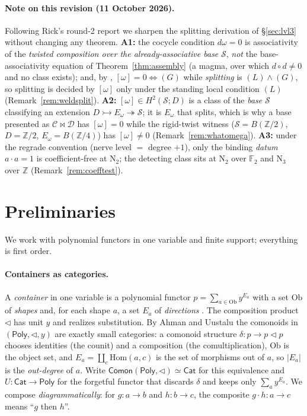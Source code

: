 \documentclass[11pt]{article}
\theoremstyle{definition}
\newcommand{\Poly}{\mathsf{Poly}}
\newcommand{\Cat}{\mathsf{Cat}}
\newcommand{\Comon}{\mathsf{Comon}}
\newcommand{\Ob}{\mathrm{Ob}}
\newcommand{\Hom}{\mathrm{Hom}}
\newcommand{\Z}{\mathbb{Z}}
\newcommand{\F}{\mathbb{F}}
\newcommand{\sS}{\mathcal{S}}
\newcommand{\cC}{\mathcal{C}}
\newcommand{\cD}{\mathcal{D}}
\newcommand{\lto}{\!\lhd\!}
\newcommand{\Nerve}{\mathrm{N}}
\begin{document}
\paragraph{Note on this revision (11 October 2026).} Following Rick's round-2 report we sharpen the
splitting derivation of \S\ref{sec:lvl3} without changing any theorem. \textbf{A1:} the cocycle
condition $d\omega=0$ is associativity of the \emph{twisted composition over the already-associative
base} $\sS$, \emph{not} the base-associativity equation of Theorem~\ref{thm:assembly} (a magma, over
which $d\circ d\neq0$ and no class exists); and, by \cite{MacBethZS}, $[\omega]=0\Leftrightarrow(G)$
while \emph{splitting} is $(L)\wedge(G)$, so splitting is decided by $[\omega]$ only under the
standing local condition $(L)$ (Remark~\ref{rem:weldsplit}). \textbf{A2:} $[\omega]\in H^2(\sS;D)$ is
a class of the \emph{base} $\sS$ classifying an extension $D\rightarrowtail E_\omega\twoheadrightarrow
\sS$; it is $E_\omega$ that splits, which is why a base presented as $\cC\bowtie\cD$ has $[\omega]=0$
while the rigid-twist witness ($\sS=B(\Z/2)$, $D=\Z/2$, $E_\omega=B(\Z/4)$) has $[\omega]\neq0$
(Remark~\ref{rem:whatomega}). \textbf{A3:} under the regrade convention (nerve level $=$ degree
$+1$), only the binding \emph{datum} $a\cdot a=1$ is coefficient-free at $\Nerve_2$; the detecting
class sits at $\Nerve_2$ over $\F_2$ and $\Nerve_3$ over $\Z$ (Remark~\ref{rem:coefftest}).

\section{Preliminaries}\label{sec:prelim}

We work with polynomial functors in one variable and finite support; everything is first order.

\paragraph{Containers as categories.}
A \emph{container} in one variable is a polynomial functor $p=\sum_{a\in\Ob}y^{E_a}$ with a set
$\Ob$ of \emph{shapes} and, for each shape $a$, a set $E_a$ of \emph{directions}
\cite{AAGM2003,GambinoKock2013}. The composition product $\lhd$ has unit $y$ and realizes
substitution. By Ahman and Uustalu \cite{AhmanUustalu2016} the comonoids in $(\Poly,\lhd,y)$ are
exactly small categories: a comonoid structure $\delta\colon p\to p\lto p$ chooses identities (the
counit) and a composition (the comultiplication), $\Ob$ is the object set, and
$E_a=\coprod_c\Hom(a,c)$ is the set of morphisms out of $a$, so $|E_a|$ is the \emph{out-degree} of
$a$. Write $\Comon(\Poly,\lhd)\simeq\Cat$ for this equivalence and $U\colon\Cat\to\Poly$ for the
forgetful functor that discards $\delta$ and keeps only $\sum_a y^{E_a}$. We compose
\emph{diagrammatically}: for $g\colon a\to b$ and $h\colon b\to c$, the composite $g\cdot h\colon
a\to c$ means ``$g$ then $h$''.
\end{document}
